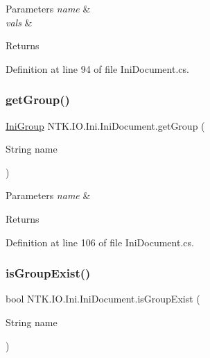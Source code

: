 \begin{DoxyParams}{Parameters}
{\em name} & \\
\hline
{\em vals} & \\
\hline
\end{DoxyParams}
\begin{DoxyReturn}{Returns}

\end{DoxyReturn}


Definition at line 94 of file Ini\+Document.\+cs.

\mbox{\label{class_n_t_k_1_1_i_o_1_1_ini_1_1_ini_document_ae4724a7590b8aac00d010e8ec81ee419}} 
\subsubsection{\texorpdfstring{getGroup()}{getGroup()}}
{\footnotesize\ttfamily \mbox{\hyperlink{class_n_t_k_1_1_i_o_1_1_ini_1_1_ini_group}{Ini\+Group}} N\+T\+K.\+I\+O.\+Ini.\+Ini\+Document.\+get\+Group (\begin{DoxyParamCaption}\item[{String}]{name }\end{DoxyParamCaption})}






\begin{DoxyParams}{Parameters}
{\em name} & \\
\hline
\end{DoxyParams}
\begin{DoxyReturn}{Returns}

\end{DoxyReturn}


Definition at line 106 of file Ini\+Document.\+cs.

\mbox{\label{class_n_t_k_1_1_i_o_1_1_ini_1_1_ini_document_a2d660b83ff739a7001808493e4fb5891}} 
\subsubsection{\texorpdfstring{isGroupExist()}{isGroupExist()}}
{\footnotesize\ttfamily bool N\+T\+K.\+I\+O.\+Ini.\+Ini\+Document.\+is\+Group\+Exist (\begin{DoxyParamCaption}\item[{String}]{name }\end{DoxyParamCaption})}



